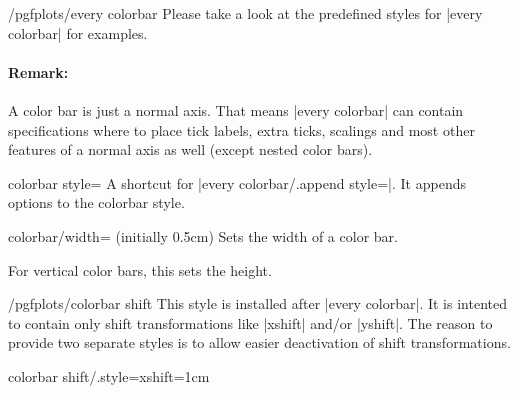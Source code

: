\begin{stylekey}{/pgfplots/every colorbar}
	Please take a look at the predefined styles for |every colorbar| for examples.

	\paragraph{Remark:} A color bar is just a normal axis. That means |every colorbar| can contain specifications where to place tick labels, extra ticks, scalings and most other features of a normal axis as well (except nested color bars).
\end{stylekey}

\begin{pgfplotskey}{colorbar style=}
	A shortcut for |every colorbar/.append style=|. It appends options to the colorbar style.
\end{pgfplotskey}

\begin{pgfplotskey}{colorbar/width= (initially 0.5cm)}
	Sets the width of a color bar.
\begin{codeexample}[]
\end{codeexample}

	For vertical color bars, this sets the height.
\end{pgfplotskey}


\begin{stylekey}{/pgfplots/colorbar shift}
	This style is installed after |every colorbar|. It is intented to contain only shift transformations like |xshift| and/or |yshift|. The reason to provide two separate styles is to allow easier deactivation of shift transformations.

\begin{codeexample}
colorbar shift/.style={xshift=1cm}
\end{codeexample}
\end{stylekey}


